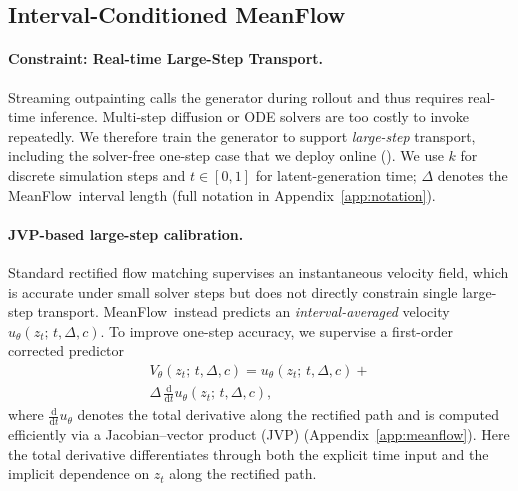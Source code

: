 \documentclass{article}
\newcommand{\MeanFlow}{MeanFlow}
\theoremstyle{plain}
\theoremstyle{definition}
\theoremstyle{remark}
\begin{document}
\subsection{Interval-Conditioned MeanFlow}
\label{sec:meanflow}


\paragraph{Constraint: Real-time Large-Step Transport.}
Streaming outpainting calls the generator during rollout and thus requires real-time inference. Multi-step diffusion or ODE solvers are too costly to invoke repeatedly.
We therefore train the generator to support \emph{large-step} transport, including the solver-free one-step case that we deploy online (). We use \(k\) for discrete simulation steps and \(t\in[0,1]\) for latent-generation time; \(\Delta\) denotes the \MeanFlow\ interval length (full notation in Appendix~\ref{app:notation}).

\paragraph{JVP-based large-step calibration.}
Standard rectified flow matching supervises an instantaneous velocity field, which is accurate under small solver steps but does not directly constrain single large-step transport.
\MeanFlow\ instead predicts an \emph{interval-averaged} velocity \(u_\theta(z_t;\,t,\Delta,c)\).
To improve one-step accuracy, we supervise a first-order corrected predictor
\begin{equation}
\begin{gathered}
V_\theta(z_t;\,t,\Delta,c) = u_\theta(z_t;\,t,\Delta,c) + \\
\Delta\,\frac{\mathrm{d}}{\mathrm{d}t}u_\theta(z_t;\,t,\Delta,c),
\end{gathered}
\end{equation}
where \(\frac{\mathrm{d}}{\mathrm{d}t}u_\theta\) denotes the total derivative along the rectified path and is computed efficiently via a Jacobian--vector product (JVP) (Appendix~\ref{app:meanflow}). Here the total derivative differentiates through both the explicit time input and the implicit dependence on \(z_t\) along the rectified path.
\end{document}
